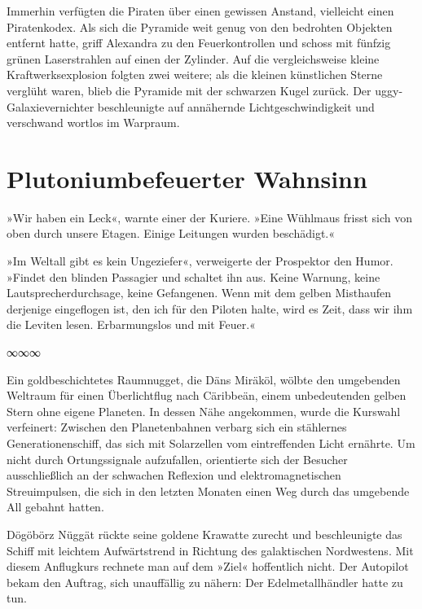 Immerhin verfügten die Piraten über einen gewissen Anstand, vielleicht einen Piratenkodex. Als sich die Pyramide weit genug von den bedrohten Objekten entfernt hatte, griff Alexandra zu den Feuerkontrollen und schoss mit fünfzig grünen Laserstrahlen auf einen der Zylinder. Auf die vergleichsweise kleine Kraftwerksexplosion folgten zwei weitere; als die kleinen künstlichen Sterne verglüht waren, blieb die Pyramide mit der schwarzen Kugel zurück. Der uggy-Galaxievernichter beschleunigte auf annähernde Lichtgeschwindigkeit und verschwand wortlos im Warpraum.


\chapter{Plutoniumbefeuerter Wahnsinn}

»Wir haben ein Leck«, warnte einer der Kuriere. »Eine Wühlmaus frisst sich von oben durch unsere Etagen. Einige Leitungen wurden beschädigt.«

»Im Weltall gibt es kein Ungeziefer«, verweigerte der Prospektor den Humor. »Findet den blinden Passagier und schaltet ihn aus. Keine Warnung, keine Lautsprecherdurchsage, keine Gefangenen. Wenn mit dem gelben Misthaufen derjenige eingeflogen ist, den ich für den Piloten halte, wird es Zeit, dass wir ihm die Leviten lesen. Erbarmungslos und mit Feuer.«

\begin{center}
	∞∞∞
\end{center}

Ein goldbeschichtetes Raumnugget, die Däns Miräköl, wölbte den umgebenden Weltraum für einen Überlichtflug nach Cäribbeän, einem unbedeutenden gelben Stern ohne eigene Planeten. In dessen Nähe angekommen, wurde die Kurswahl verfeinert: Zwischen den Planetenbahnen verbarg sich ein stählernes Generationenschiff, das sich mit Solarzellen vom eintreffenden Licht ernährte. Um nicht durch Ortungssignale aufzufallen, orientierte sich der Besucher ausschließlich an der schwachen Reflexion und elektromagnetischen Streuimpulsen, die sich in den letzten Monaten einen Weg durch das umgebende All gebahnt hatten.


Dögöbörz Nüggät rückte seine goldene Krawatte zurecht und beschleunigte das Schiff mit leichtem Aufwärtstrend in Richtung des galaktischen Nordwestens. Mit diesem Anflugkurs rechnete man auf dem »Ziel« hoffentlich nicht. Der Autopilot bekam den Auftrag, sich unauffällig zu nähern: Der Edelmetallhändler hatte zu tun.

